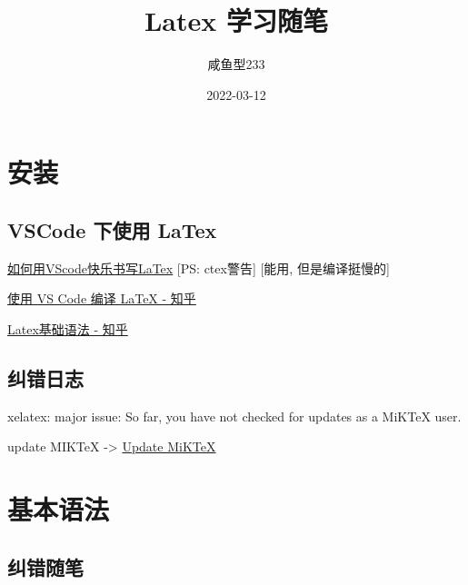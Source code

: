 \documentclass[UTF8]{UJSBachelor} %
\title{Latex 学习随笔}
\author{咸鱼型233}
\date{2022-03-12}
\begin{document}
\maketitle  %
\tableofcontents

\chapter{安装}
\section{VSCode 下使用 LaTex}
\href{https://zhuanlan.zhihu.com/p/337813181}{如何用VScode快乐书写LaTex}
[PS: ctex警告] [能用, 但是编译挺慢的]

\href{https://zhuanlan.zhihu.com/p/382472221}{使用 VS Code 编译 LaTeX - 知乎}

\href{https://zhuanlan.zhihu.com/p/52347414}{Latex基础语法 - 知乎}

\section{纠错日志}

xelatex: major issue: So far, you have not checked for updates as a MiKTeX user.

update MIKTeX -> \href{https://miktex.org/howto/update-miktex}{Update MiKTeX}


\chapter{基本语法}


\section{纠错随笔}
\end{document}
